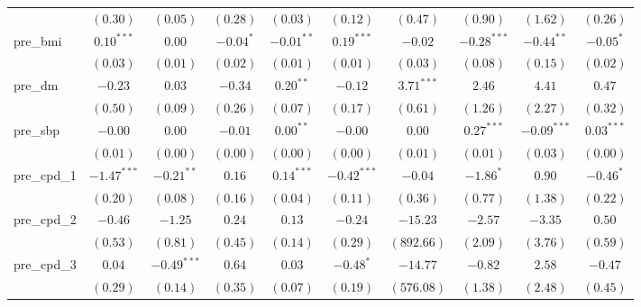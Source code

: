 \begin{tabular}{l c c c c c c c c c}
                 & $(0.30)$      & $(0.05)$      & $(0.28)$      & $(0.03)$      & $(0.12)$      & $(0.47)$       & $(0.90)$      & $(1.62)$      & $(0.26)$       \\
pre\_bmi         & $0.10^{***}$  & $0.00$        & $-0.04^{*}$   & $-0.01^{**}$  & $0.19^{***}$  & $-0.02$        & $-0.28^{***}$ & $-0.44^{**}$  & $-0.05^{*}$    \\
                 & $(0.03)$      & $(0.01)$      & $(0.02)$      & $(0.01)$      & $(0.01)$      & $(0.03)$       & $(0.08)$      & $(0.15)$      & $(0.02)$       \\
pre\_dm          & $-0.23$       & $0.03$        & $-0.34$       & $0.20^{**}$   & $-0.12$       & $3.71^{***}$   & $2.46$        & $4.41$        & $0.47$         \\
                 & $(0.50)$      & $(0.09)$      & $(0.26)$      & $(0.07)$      & $(0.17)$      & $(0.61)$       & $(1.26)$      & $(2.27)$      & $(0.32)$       \\
pre\_sbp         & $-0.00$       & $0.00$        & $-0.01$       & $0.00^{**}$   & $-0.00$       & $0.00$         & $0.27^{***}$  & $-0.09^{***}$ & $0.03^{***}$   \\
                 & $(0.01)$      & $(0.00)$      & $(0.00)$      & $(0.00)$      & $(0.00)$      & $(0.01)$       & $(0.01)$      & $(0.03)$      & $(0.00)$       \\
pre\_cpd\_1      & $-1.47^{***}$ & $-0.21^{**}$  & $0.16$        & $0.14^{***}$  & $-0.42^{***}$ & $-0.04$        & $-1.86^{*}$   & $0.90$        & $-0.46^{*}$    \\
                 & $(0.20)$      & $(0.08)$      & $(0.16)$      & $(0.04)$      & $(0.11)$      & $(0.36)$       & $(0.77)$      & $(1.38)$      & $(0.22)$       \\
pre\_cpd\_2      & $-0.46$       & $-1.25$       & $0.24$        & $0.13$        & $-0.24$       & $-15.23$       & $-2.57$       & $-3.35$       & $0.50$         \\
                 & $(0.53)$      & $(0.81)$      & $(0.45)$      & $(0.14)$      & $(0.29)$      & $(892.66)$     & $(2.09)$      & $(3.76)$      & $(0.59)$       \\
pre\_cpd\_3      & $0.04$        & $-0.49^{***}$ & $0.64$        & $0.03$        & $-0.48^{*}$   & $-14.77$       & $-0.82$       & $2.58$        & $-0.47$        \\
                 & $(0.29)$      & $(0.14)$      & $(0.35)$      & $(0.07)$      & $(0.19)$      & $(576.08)$     & $(1.38)$      & $(2.48)$      & $(0.45)$       \\

\end{tabular}
